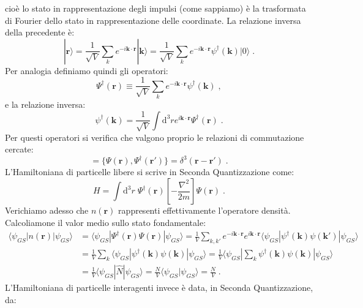 \documentclass[10pt,a4paper]{report}
\theoremstyle{definition}
\numberwithin{equation}{section}
\newcommand{\diff}[1][]{\mathrm{d}#1}
\newcommand{\bra}{\langle}
\newcommand{\ket}{\rangle}
\begin{document}
cioè lo stato in rappresentazione degli impulsi (come sappiamo) è la trasformata di Fourier dello stato in rappresentazione delle coordinate. La relazione inversa della precedente è:
\begin{equation}
|\mathbf{r}\ket=\frac{1}{\sqrt{V}}\sum_k e^{-i\mathbf{k}\cdot\mathbf{r}}|\mathbf{k}\ket=\frac{1}{\sqrt{V}}\sum_k e^{-i\mathbf{k}\cdot\mathbf{r}}\psi^{\dagger}(\mathbf{k})|0\ket\;.
\end{equation}
Per analogia definiamo quindi gli operatori:
\begin{equation}
\Psi^{\dagger}(\mathbf{r})\equiv \frac{1}{\sqrt{V}}\sum_k e^{-i\mathbf{k}\cdot\mathbf{r}}\psi^{\dagger}(\mathbf{k})\;,
\end{equation}
e la relazione inversa:
\begin{equation}
\psi^{\dagger}(\mathbf{k})=\frac{1}{\sqrt{V}}\int\diff^3{r}e^{i\mathbf{k}\cdot\mathbf{r}}\Psi^{\dagger}(\mathbf{r})\;.
\end{equation}
Per questi operatori si verifica che valgono proprio le relazioni di commutazione cercate:
\begin{equation}
[\Psi(\mathbf{r}),\Psi^{\dagger}(\mathbf{r}')]=\{\Psi(\mathbf{r}),\Psi^{\dagger}(\mathbf{r}')\}=\delta^3(\mathbf{r}-\mathbf{r}')\;.
\end{equation}
L'Hamiltoniana di particelle libere si scrive in Seconda Quantizzazione come:
\begin{equation}
H=\int\diff^3{r}\; \Psi^{\dagger}(\mathbf{r})\left[-\frac{\nabla^2}{2m}\right]\Psi(\mathbf{r})\;.
\end{equation}
Verichiamo adesso che $n(\mathbf{r})$ rappresenti effettivamente l'operatore densità. Calcoliamone il valor medio sullo stato fondamentale:
\begin{align*}
\bra \psi_{GS}|n(\mathbf{r})|\psi_{GS}\ket &=\bra\psi_{GS}|\Psi^{\dagger}(\mathbf{r})\Psi(\mathbf{r})|\psi_{GS}\ket=
\frac{1}{V}\sum_{k,k'}e^{-i\mathbf{k}\cdot\mathbf{r}}e^{i\mathbf{k}\cdot\mathbf{r}}\bra\psi_{GS}|\psi^{\dagger}(\mathbf{k})\psi(\mathbf{k}')|\psi_{GS}\ket \\
&= \frac{1}{V}\sum_k\bra\psi_{GS}|\psi^{\dagger}(\mathbf{k})\psi(\mathbf{k})|\psi_{GS}\ket=\frac{1}{V}\bra\psi_{GS}|\sum_k \psi^{\dagger}(\mathbf{k})\psi(\mathbf{k})|\psi_{GS}\ket \\
&= \frac{1}{V}\bra \psi_{GS}|\hat{N}|\psi_{GS}\ket=\frac{N}{V}\bra\psi_{GS}|\psi_{GS}\ket=\frac{N}{V}\;.
\end{align*}
L'Hamiltoniana di particelle interagenti invece è data, in Seconda Quantizzazione, da:
\end{document}

